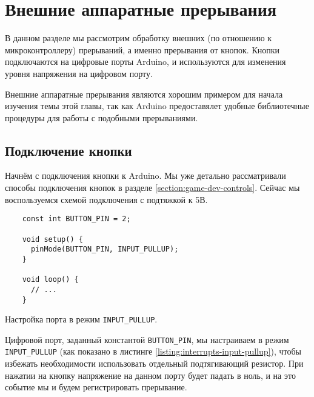 \documentclass[../sparc.tex]{subfiles}
\begin{document}
\section{Внешние аппаратные прерывания}

В данном разделе мы рассмотрим обработку внешних (по отношению к
микроконтроллеру) прерываний, а именно прерывания от кнопок.  Кнопки
подключаются на цифровые порты Arduino, и используются для изменения уровня
напряжения на цифровом порту.

Внешние аппаратные прерывания являются хорошим примером для начала изучения темы
этой главы, так как Arduino предоставялет удобные библиотечные процедуры для
работы с подобными прерываниями.

\subsection{Подключение кнопки}
\label{section:interrupts-button}

Начнём с подключения кнопки к Arduino.  Мы уже детально рассматривали способы
подключения кнопок в разделе \ref{section:game-dev-controls}.  Сейчас мы
воспользуемся схемой подключения с подтяжкой к 5В.


\begin{listing}[H]
  \begin{verbatim}
    const int BUTTON_PIN = 2;

    void setup() {
      pinMode(BUTTON_PIN, INPUT_PULLUP);
    }

    void loop() {
      // ...
    }
  \end{verbatim}
  \caption{Настройка порта в режим \texttt{INPUT_PULLUP}.}
  \label{listing:interrupts-input-pullup}
\end{listing}

Цифровой порт, заданный константой \texttt{BUTTON_PIN}, мы настраиваем
в режим \texttt{INPUT_PULLUP} (как показано в листинге
\ref{listing:interrupts-input-pullup}), чтобы избежать необходимости
использовать отдельный подтягивающий резистор.  При нажатии на кнопку напряжение
на данном порту будет падать в ноль, и на это событие мы и будем регистрировать
прерывание.

\end{document}
